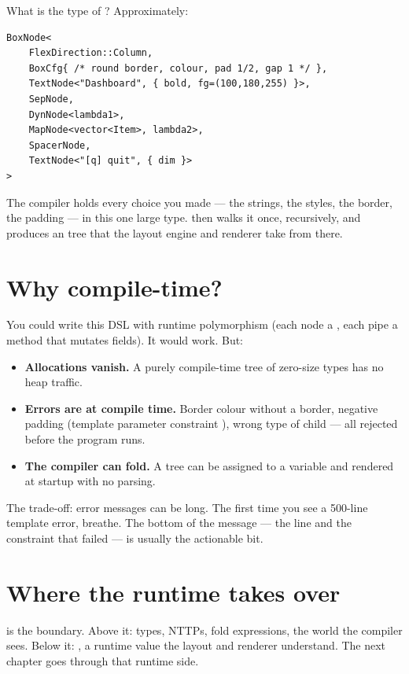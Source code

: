 What is the type of ? Approximately:

\begin{lstlisting}
BoxNode<
    FlexDirection::Column,
    BoxCfg{ /* round border, colour, pad 1/2, gap 1 */ },
    TextNode<"Dashboard", { bold, fg=(100,180,255) }>,
    SepNode,
    DynNode<lambda1>,
    MapNode<vector<Item>, lambda2>,
    SpacerNode,
    TextNode<"[q] quit", { dim }>
>
\end{lstlisting}

The compiler holds every choice you made --- the strings, the styles,
the border, the padding --- in this one large type. 
then walks it once, recursively, and produces an  tree
that the layout engine and renderer take from there.

\section{Why compile-time?}

You could write this DSL with runtime polymorphism (each node a
, each pipe a method that mutates fields). It
would work. But:

\begin{itemize}[leftmargin=*]
  \item \textbf{Allocations vanish.} A purely compile-time tree of
    zero-size types has no heap traffic.
  \item \textbf{Errors are at compile time.} Border colour without a
    border, negative padding (template parameter constraint
    ), wrong type of child --- all rejected before the
    program runs.
  \item \textbf{The compiler can fold.} A  tree can
    be assigned to a  variable and rendered at startup
    with no parsing.
\end{itemize}

The trade-off: error messages can be long. The first time you see a
500-line template error, breathe. The bottom of the message --- the
 line and the constraint that failed --- is
usually the actionable bit.

\section{Where the runtime takes over}

 is the boundary. Above it: types, NTTPs, fold
expressions, the world the compiler sees. Below it: , a
runtime value the layout and renderer understand. The next chapter
goes through that runtime side.


